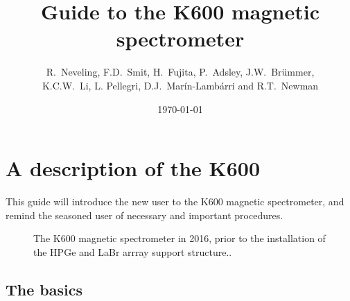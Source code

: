 \documentclass[11pt]{report}
\begin{document}

\title{Guide to the K600 magnetic spectrometer}
\date{\today}
\author{R.~Neveling, F.D.~Smit, H.~Fujita, P.~Adsley, J.W.~Br\"ummer, \\ K.C.W.~Li, 
L. Pellegri, D.J.~Mar\'in-Lamb\'arri and R.T.~Newman}
\maketitle



\newpage
\tableofcontents 
\newpage
\chapter{A description of the K600}

This guide will introduce the new user to the K600 magnetic spectrometer,
and remind the seasoned user of necessary and important procedures.

\begin{figure}[!h]
\centerline{\vspace{0cm}\hspace{0cm}
}
\centering
\caption{The K600 magnetic spectrometer in 2016, prior to the installation of the HPGe and LaBr arrray support structure..}
\label{fig:k600}
\end{figure} 

\newpage

\section{The basics}
\end{document}
